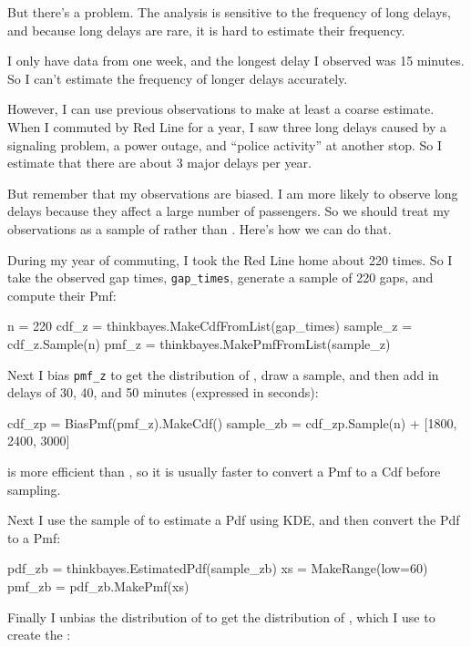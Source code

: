 \documentclass[12pt]{book}
\theoremstyle{exercise}
\begin{document}
But there's a problem.
The analysis is sensitive to the frequency of long delays, and
because long delays are rare, it is hard to estimate
their frequency.

I only have data from one week,
and the longest delay I observed was 15 minutes.  So I can't
estimate the frequency of longer delays accurately.

However, I can use previous observations to make at least a coarse
estimate.  When I commuted by Red Line for a year, I saw three long
delays caused by a signaling problem, a power outage, and ``police
activity'' at another stop.  So I estimate that there are about
3 major delays per year.

But remember that my observations are biased.  I am more likely
to observe long delays because they affect a large number
of passengers.  So we should treat my observations as a sample
of  rather than .  Here's how we can do that.

During my year of commuting, I took the Red Line home about 220
times.  So I take the observed gap times, \verb"gap_times",
generate a sample of 220 gaps, and compute their Pmf:

\begin{code}
    n = 220
    cdf_z = thinkbayes.MakeCdfFromList(gap_times)
    sample_z = cdf_z.Sample(n)
    pmf_z = thinkbayes.MakePmfFromList(sample_z)
\end{code}

Next I bias \verb"pmf_z" to get the distribution of
, draw a sample, and then add in delays of
30, 40, and 50 minutes (expressed in seconds):

\begin{code}
    cdf_zp = BiasPmf(pmf_z).MakeCdf()
    sample_zb = cdf_zp.Sample(n) + [1800, 2400, 3000]
\end{code}

 is more efficient than , so it
is usually faster to convert a Pmf to a Cdf before sampling.

Next I use the sample of  to estimate a Pdf using
KDE, and then convert the Pdf to a Pmf:

\begin{code}
    pdf_zb = thinkbayes.EstimatedPdf(sample_zb)
    xs = MakeRange(low=60)
    pmf_zb = pdf_zb.MakePmf(xs)
\end{code}

Finally I unbias the distribution of  to get the
distribution of , which I use to create the
:
\end{document}
